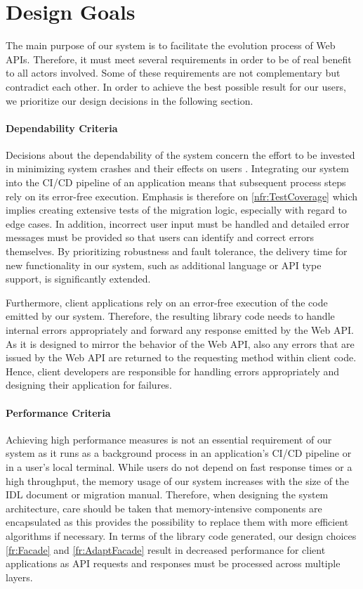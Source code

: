 \section{Design Goals}
\label{sec:DesignGoals}

The main purpose of our system is to facilitate the evolution process of Web APIs. Therefore, it must meet several requirements in order to be of real benefit to all actors involved. Some of these requirements are not complementary but contradict each other. In order to achieve the best possible result for our users, we prioritize our design decisions in the following section.

\paragraph{Dependability Criteria}
Decisions about the dependability of the system concern the effort to be invested in minimizing system crashes and their effects on users \cite{bruegge_object-oriented_2010}. Integrating our system into the CI/CD pipeline of an application means that subsequent process steps rely on its error-free execution. Emphasis is therefore on \ref{nfr:TestCoverage} which implies creating extensive tests of the migration logic, especially with regard to edge cases. In addition, incorrect user input must be handled and detailed error messages must be provided so that users can identify and correct errors themselves. By prioritizing robustness and fault tolerance, the delivery time for new functionality in our system, such as additional language or API type support, is significantly extended. 

Furthermore, client applications rely on an error-free execution of the code emitted by our system. Therefore, the resulting library code needs to handle internal errors appropriately and forward any response emitted by the Web API.  As it is designed to mirror the behavior of the Web API, also any errors that are issued by the Web API are returned to the requesting method within client code. Hence, client developers are responsible for handling errors appropriately and designing their application for failures. 

\paragraph{Performance Criteria}
Achieving high performance measures is not an essential requirement of our system as it runs as a background process in an application's CI/CD pipeline or in a user's local terminal. While users do not depend on fast response times or a high throughput, the memory usage of our system increases with the size of the IDL document or migration manual. Therefore, when designing the system architecture, care should be taken that memory-intensive components are encapsulated as this provides the possibility to replace them with more efficient algorithms if necessary. In terms of the library code generated, our design choices \ref{fr:Facade} and \ref{fr:AdaptFacade} result in decreased performance for client applications as API requests and responses must be processed across multiple layers.

